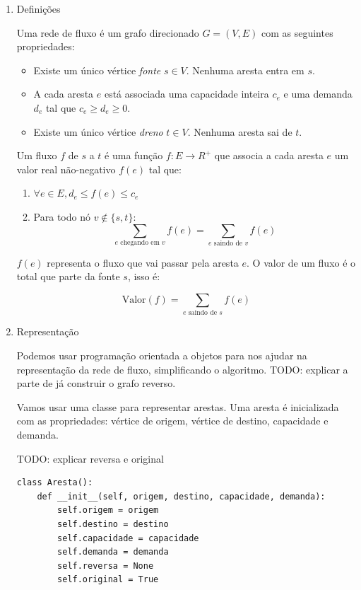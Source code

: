 \documentclass[11pt]{article}
\begin{document}
\begin{enumerate}
\item Definições
\label{sec-3-3-1-1}

Uma rede de fluxo é um grafo direcionado $G =
(V, E)$ com as seguintes propriedades:
\begin{itemize}
\item Existe um único vértice \textit{fonte} $s \in V$. Nenhuma aresta entra em $s$.
\item A cada aresta $e$ está associada uma capacidade inteira $c_e$ e
uma demanda $d_e$ tal que $c_e \geq d_e \geq 0$.
\item Existe um único vértice \textit{dreno} $t \in V$. Nenhuma aresta sai de $t$.
\end{itemize}

Um fluxo $f$ de $s$ a $t$ é uma função $f \colon E \to R^+$ que associa a cada
aresta $e$ um valor real não-negativo $f(e)$ tal que:

\begin{enumerate}
\item $\forall e \in E, d_e \leq f(e) \leq c_e$
\item Para todo nó $v \not\in \{s,t\}$:
\[ \sum_{e \text{ chegando em } v} f(e) = \sum_{e \text{ saindo de } v} f(e) \]
\end{enumerate}

$f(e)$ representa o fluxo que vai passar pela aresta $e$. O valor de
um fluxo é o total que parte da fonte $s$, isso é:

$$\label{valor_fluxo} \mathrm{Valor}(f) = \sum_{e \text{ saindo de } s} f(e) $$

\item Representação
\label{sec-3-3-1-2}

Podemos usar programação orientada a objetos para nos ajudar na
representação da rede de fluxo, simplificando o algoritmo.
TODO: explicar a parte de já construir o grafo reverso.

Vamos usar uma classe para representar arestas. Uma aresta é
inicializada com as propriedades: vértice de origem, vértice de
destino, capacidade e demanda.

TODO: explicar reversa e original
\begin{verbatim}
class Aresta():
    def __init__(self, origem, destino, capacidade, demanda):
        self.origem = origem
        self.destino = destino
        self.capacidade = capacidade
        self.demanda = demanda
        self.reversa = None
        self.original = True
\end{verbatim}


\end{enumerate}
\end{document}
